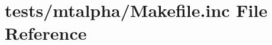 \hypertarget{tests_2mtalpha_2_makefile_8inc}{\section{tests/mtalpha/\+Makefile.inc File Reference}
\label{tests_2mtalpha_2_makefile_8inc}
}
